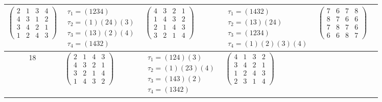\begin{longtable}{|c|p{2.7cm}|p{2.7cm}|p{2.7cm}|p{2.7cm}|p{2.7cm}|}
    $\begin{pmatrix} 2 & 1 & 3 & 4 \\ 4 & 3 & 1 & 2 \\ 3 & 4 & 2 & 1 \\ 1 & 2 & 4 & 3 \end{pmatrix}$               &
    $\begin{array}{l}\tau_{1}=(1234)\\ \tau_{2}=(1)(24)(3)\\ \tau_{3}=(13)(2)(4)\\ \tau_{4}=(1432)\end{array}$     &
    $\begin{pmatrix} 4 & 3 & 2 & 1 \\ 1 & 4 & 3 & 2 \\ 2 & 1 & 4 & 3 \\ 3 & 2 & 1 & 4 \end{pmatrix}$               &
    $\begin{array}{l}\tau_{1}=(1432)\\ \tau_{2}=(13)(24)\\ \tau_{3}=(1234)\\ \tau_{4}=(1)(2)(3)(4)\end{array}$     &
    $\begin{pmatrix} 7 & 6 & 7 & 8 \\ 8 & 7 & 6 & 6 \\ 7 & 8 & 7 & 6 \\ 6 & 6 & 8 & 7 \end{pmatrix}$                                                                                           \\
    \hline
    18                                                                                                             &
    $\begin{pmatrix} 2 & 1 & 4 & 3 \\ 4 & 3 & 2 & 1 \\ 3 & 2 & 1 & 4 \\ 1 & 4 & 3 & 2 \end{pmatrix}$               &
    $\begin{array}{l}\tau_{1}=(124)(3)\\ \tau_{2}=(1)(23)(4)\\ \tau_{3}=(143)(2)\\ \tau_{4}=(1342)\end{array}$     &
    $\begin{pmatrix} 4 & 1 & 3 & 2 \\ 3 & 4 & 2 & 1 \\ 1 & 2 & 4 & 3 \\ 2 & 3 & 1 & 4 \end{pmatrix}$               &

\end{longtable}
